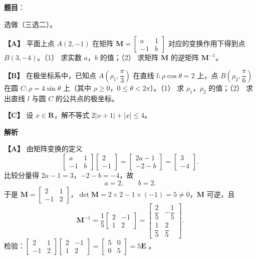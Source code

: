 \begin{answer}

\textbf{题目}：

选做（三选二）。

\textbf{【A】} 平面上点 $A(2,-1)$ 在矩阵 $\boldsymbol M=\begin{bmatrix}a&1\\-1&b\end{bmatrix}$ 对应的变换作用下得到点 $B(3,-4)$。（1） 求实数 $a$，$b$ 的值；（2） 求矩阵 $\boldsymbol M$ 的逆矩阵 $\boldsymbol M^{-1}$。

\textbf{【B】} 在极坐标系中，已知点 $A\left(\rho_1,\dfrac\pi3\right)$ 在直线 $l:\rho\cos\theta=2$ 上，点 $B\left(\rho_2,\dfrac\pi6\right)$ 在圆 $C:\rho=4\sin\theta$ 上（其中 $\rho\geqslant0$，$0\leqslant\theta<2\pi$）。（1） 求 $\rho_1$，$\rho_2$ 的值；（2） 求出直线 $l$ 与圆 $C$ 的公共点的极坐标。

\textbf{【C】} 设 $x\in\mathbf R$，解不等式 $2|x+1|+|x|\leqslant4$。

\textbf{解析}

\textbf{【A】} 由矩阵变换的定义
\nopagebreak[4]
\[\begin{bmatrix}a&1\\-1&b\end{bmatrix}\begin{bmatrix}2\\-1\end{bmatrix}=\begin{bmatrix}2a-1\\-2-b\end{bmatrix}=\begin{bmatrix}3\\-4\end{bmatrix}.\]
比较分量得 $2a-1=3$，$-2-b=-4$，故
\nopagebreak[4]
\[a=2,\qquad b=2 .\]
于是 $\boldsymbol M=\begin{bmatrix}2&1\\-1&2\end{bmatrix}$，$\det\boldsymbol M=2\times2-1\times(-1)=5\neq0$，$\boldsymbol M$ 可逆，且
\nopagebreak[4]
\[\boldsymbol M^{-1}=\frac15\begin{bmatrix}2&-1\\1&2\end{bmatrix}=\begin{bmatrix}\dfrac25&-\dfrac15\\\dfrac15&\dfrac25\end{bmatrix}.\]
检验：$\begin{bmatrix}2&1\\-1&2\end{bmatrix}\begin{bmatrix}2&-1\\1&2\end{bmatrix}=\begin{bmatrix}5&0\\0&5\end{bmatrix}=5\boldsymbol E$ 。


\end{answer}
